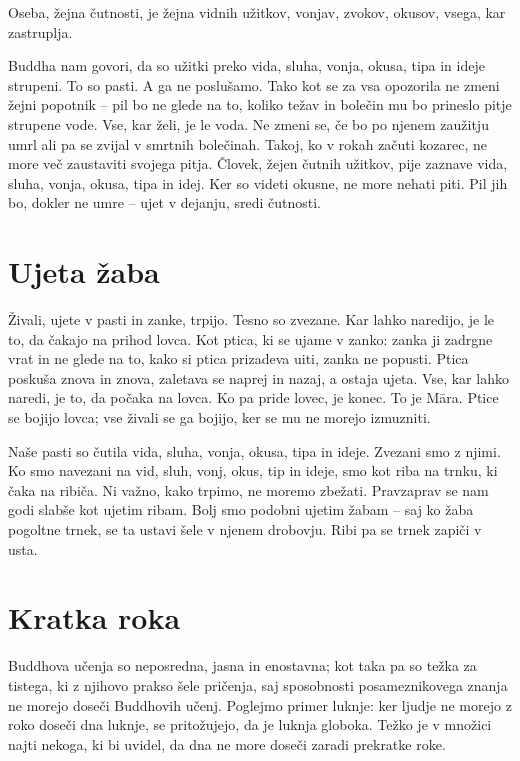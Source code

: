 Oseba, žejna čutnosti, je žejna vidnih užitkov, vonjav, zvokov, okusov, vsega, kar zastruplja.

Buddha nam govori, da so užitki preko vida, sluha, vonja, okusa, tipa in ideje strupeni. To so pasti. A ga ne poslušamo. Tako kot se za vsa opozorila ne zmeni žejni popotnik – pil bo ne glede na to, koliko težav in bolečin mu bo prineslo pitje strupene vode. Vse, kar želi, je le voda. Ne zmeni se, če bo po njenem zaužitju umrl ali pa se zvijal v smrtnih bolečinah. Takoj, ko v rokah začuti kozarec, ne more več zaustaviti svojega pitja. Človek, žejen čutnih užitkov, pije zaznave vida, sluha, vonja, okusa, tipa in idej. Ker so videti okusne, ne more nehati piti. Pil jih bo, dokler ne umre – ujet v dejanju, sredi čutnosti.

\section{Ujeta žaba}

Živali, ujete v pasti in zanke, trpijo. Tesno so zvezane. Kar lahko naredijo, je le to, da čakajo na prihod lovca. Kot ptica, ki se ujame v zanko: zanka ji zadrgne vrat in ne glede na to, kako si ptica prizadeva uiti, zanka ne popusti. Ptica poskuša znova in znova, zaletava se naprej in nazaj, a ostaja ujeta. Vse, kar lahko naredi, je to, da počaka na lovca. Ko pa pride lovec, je konec. To je Māra. Ptice se bojijo lovca; vse živali se ga bojijo, ker se mu ne morejo izmuzniti.

Naše pasti so čutila vida, sluha, vonja, okusa, tipa in ideje. Zvezani smo z njimi. Ko smo navezani na vid, sluh, vonj, okus, tip in ideje, smo kot riba na trnku, ki čaka na ribiča. Ni važno, kako trpimo, ne moremo zbežati. Pravzaprav se nam godi slabše kot ujetim ribam. Bolj smo podobni ujetim žabam – saj ko žaba pogoltne trnek, se ta ustavi šele v njenem drobovju. Ribi pa se trnek zapiči v usta.

\section{Kratka roka}

Buddhova učenja so neposredna, jasna in enostavna; kot taka pa so težka za tistega, ki z njihovo prakso šele pričenja, saj sposobnosti posameznikovega znanja ne morejo doseči Buddhovih učenj. Poglejmo primer luknje: ker ljudje ne morejo z roko doseči dna luknje, se pritožujejo, da je luknja globoka. Težko je v množici najti nekoga, ki bi uvidel, da dna ne more doseči zaradi prekratke roke.

